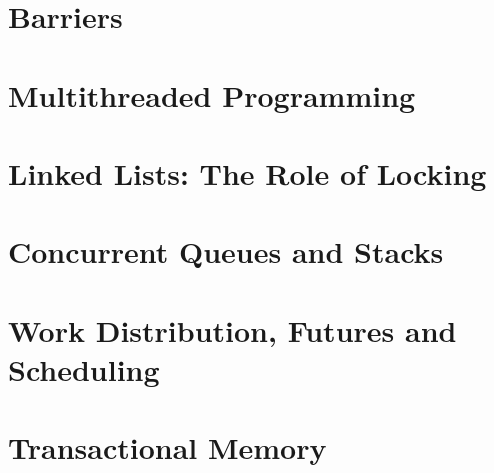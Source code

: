 \documentclass{article}
\begin{document}
\section{Barriers}

\section{Multithreaded Programming}

\section{Linked Lists: The Role of Locking}

\section{Concurrent Queues and Stacks}

\section{Work Distribution, Futures and Scheduling}

\section{Transactional Memory}
\end{document}
